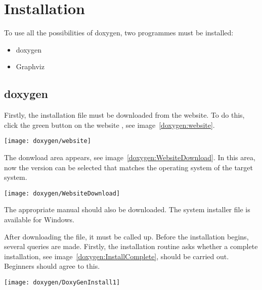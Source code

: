 \section{Installation}

To use all the possibilities of doxygen, two programmes must be installed:

\begin{itemize}
    \item doxygen
    \item Graphviz
\end{itemize}






\subsection{doxygen}

Firstly, the installation file must be downloaded from the website. To do this, click the green button   on the website , see image~\ref{doxygen:website}.

\begin{center}
  \texttt{[image: doxygen/website]}
  \label{doxygen:website}
\end{center} 

The donwload area appears, see image~\ref{doxygen:WebsiteDownload}. In this area, now the version can be selected that matches the operating system of the target system.


\begin{center}
    \texttt{[image: doxygen/WebsiteDownload]}
    \label{doxygen:WebsiteDownload}
\end{center} 

The appropriate manual \cite{VanHeesch:2024b} should also be downloaded. The system installer file   is available for Windows. 

After downloading the file, it must be called up. Before the installation begins, several queries are made. Firstly, the installation routine asks whether a complete installation, see image~\ref{doxygen:InstallComplete}, should be carried out. Beginners should agree to this.

\begin{center}
    \texttt{[image: doxygen/DoxyGenInstall1]}
    \label{doxygen:InstallComplete}
\end{center} 




